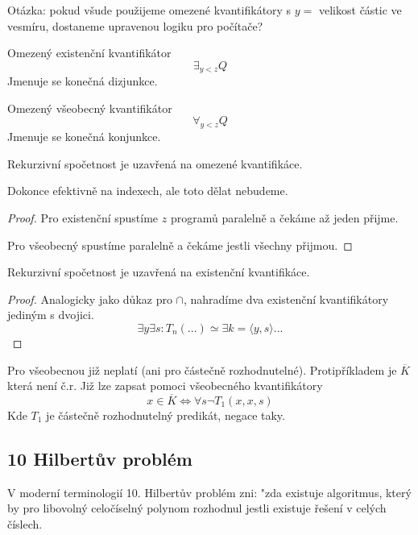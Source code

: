 Otázka: pokud všude použijeme omezené kvantifikátory s $y =$ velikost částic ve vesmíru, dostaneme upravenou logiku pro počítače?

\begin{definition}
	Omezený existenční kvantifikátor
	\[ \exists_{y < z} Q \]
	Jmenuje se konečná dizjunkce.
\end{definition}

\begin{definition}
	Omezený všeobecný kvantifikátor
	\[ \forall_{y < z} Q \]
	Jmenuje se konečná konjunkce.
\end{definition}

\begin{theorem}\label{omez_kvant}
	Rekurzivní spočetnost je uzavřená na omezené kvantifikáce.

	Dokonce efektivně na indexech, ale toto dělat nebudeme.
\end{theorem}
\begin{proof}
	Pro existenční spustíme $z$ programů paralelně a čekáme až jeden přijme.

	Pro všeobecný spustíme paralelně a čekáme jestli všechny přijmou.
\end{proof}

\begin{theorem}\label{neomez_kvant}
	Rekurzivní spočetnost je uzavřená na existenční kvantifikáce.
\end{theorem}
\begin{proof}
	Analogicky jako důkaz pro $\cap$, nahradíme dva existenční kvantifikátory jediným s dvojici.
	\[ \exists y \exists s: T_n(...) \simeq \exists k = \langle y, s \rangle ... \]
\end{proof}

\begin{note}
	Pro všeobecnou již neplatí (ani pro částečně rozhodnutelné).
	Protipříkladem je $\overline{K}$ která není č.r.
	Již lze zapsat pomoci všeobecného kvantifikátory
	\[ x \in \overline{K} \iff \forall s \neg T_1(x, x, s) \]
	Kde $T_1$ je částečně rozhodnutelný predikát, negace taky.
\end{note}

\subsection{10 Hilbertův problém}

V moderní terminologií 10. Hilbertův problém zni: "zda existuje algoritmus, který by pro libovolný celočíselný polynom rozhodnul jestli existuje řešení v celých číslech.

